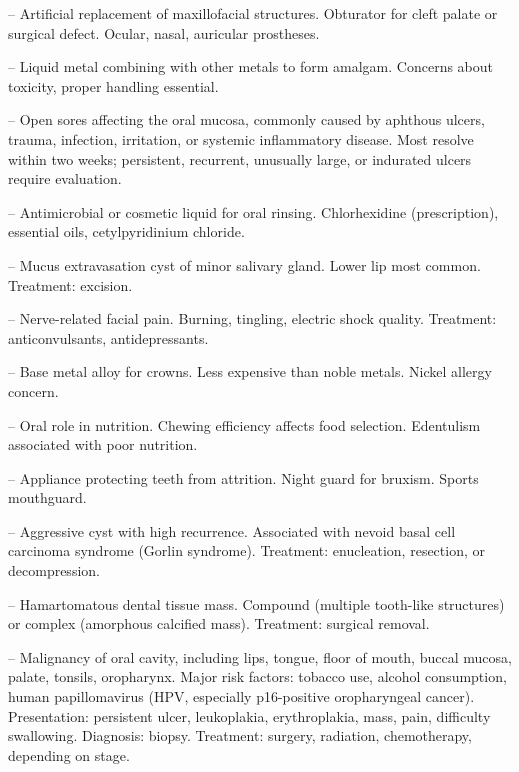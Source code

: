 -- Artificial replacement of maxillofacial structures. Obturator for cleft palate or surgical defect. Ocular, nasal, auricular prostheses.

-- Liquid metal combining with other metals to form amalgam. Concerns about toxicity, proper handling essential.

-- Open sores affecting the oral mucosa, commonly caused by aphthous ulcers, trauma, infection, irritation, or systemic inflammatory disease. Most resolve within two weeks; persistent, recurrent, unusually large, or indurated ulcers require evaluation.

-- Antimicrobial or cosmetic liquid for oral rinsing. Chlorhexidine (prescription), essential oils, cetylpyridinium chloride.

-- Mucus extravasation cyst of minor salivary gland. Lower lip most common. Treatment: excision.

-- Nerve-related facial pain. Burning, tingling, electric shock quality. Treatment: anticonvulsants, antidepressants.

-- Base metal alloy for crowns. Less expensive than noble metals. Nickel allergy concern.

-- Oral role in nutrition. Chewing efficiency affects food selection. Edentulism associated with poor nutrition.

-- Appliance protecting teeth from attrition. Night guard for bruxism. Sports mouthguard.

-- Aggressive cyst with high recurrence. Associated with nevoid basal cell carcinoma syndrome (Gorlin syndrome). Treatment: enucleation, resection, or decompression.

-- Hamartomatous dental tissue mass. Compound (multiple tooth-like structures) or complex (amorphous calcified mass). Treatment: surgical removal.

-- Malignancy of oral cavity, including lips, tongue, floor of mouth, buccal mucosa, palate, tonsils, oropharynx. Major risk factors: tobacco use, alcohol consumption, human papillomavirus (HPV, especially p16-positive oropharyngeal cancer). Presentation: persistent ulcer, leukoplakia, erythroplakia, mass, pain, difficulty swallowing. Diagnosis: biopsy. Treatment: surgery, radiation, chemotherapy, depending on stage.


